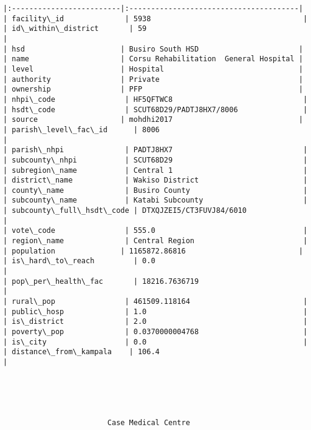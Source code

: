 \documentclass[11pt]{article}
\begin{document}
\begin{Verbatim}[commandchars=\\\{\}]
|:-------------------------|:---------------------------------------|
| facility\_id              | 5938                                   |
| id\_within\_district       | 59                                     |
| hsd                      | Busiro South HSD                       |
| name                     | Corsu Rehabilitation  General Hospital |
| level                    | Hospital                               |
| authority                | Private                                |
| ownership                | PFP                                    |
| nhpi\_code                | HF5QFTWC8                              |
| hsdt\_code                | SCUT68D29/PADTJ8HX7/8006               |
| source                   | mohdhi2017                             |
| parish\_level\_fac\_id      | 8006                                   |
| parish\_nhpi              | PADTJ8HX7                              |
| subcounty\_nhpi           | SCUT68D29                              |
| subregion\_name           | Central 1                              |
| district\_name            | Wakiso District                        |
| county\_name              | Busiro County                          |
| subcounty\_name           | Katabi Subcounty                       |
| subcounty\_full\_hsdt\_code | DTXQJZEI5/CT3FUVJ84/6010               |
| vote\_code                | 555.0                                  |
| region\_name              | Central Region                         |
| population               | 1165872.86816                          |
| is\_hard\_to\_reach         | 0.0                                    |
| pop\_per\_health\_fac       | 18216.7636719                          |
| rural\_pop                | 461509.118164                          |
| public\_hosp              | 1.0                                    |
| is\_district              | 2.0                                    |
| poverty\_pop              | 0.0370000004768                        |
| is\_city                  | 0.0                                    |
| distance\_from\_kampala    | 106.4                                  |





                        Case Medical Centre                        


\end{Verbatim}
\end{document}
